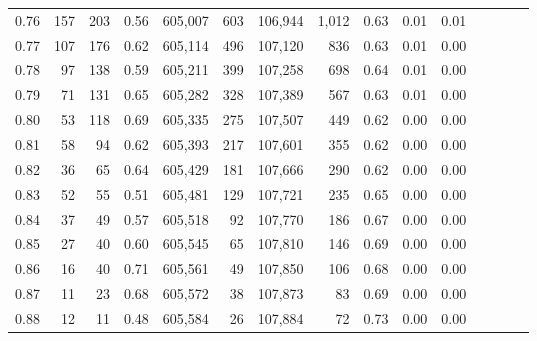 \begin{tabular}{rrrcrrrrrrrrrrr}
0.76 &     157 &    203 &                                       0.56 &  605,007 &      603 &  106,944 &    1,012 &  0.63 &  0.01 &                         0.01 \\
0.77 &     107 &    176 &                                       0.62 &  605,114 &      496 &  107,120 &      836 &  0.63 &  0.01 &                         0.00 \\
0.78 &      97 &    138 &                                       0.59 &  605,211 &      399 &  107,258 &      698 &  0.64 &  0.01 &                         0.00 \\
0.79 &      71 &    131 &                                       0.65 &  605,282 &      328 &  107,389 &      567 &  0.63 &  0.01 &                         0.00 \\
0.80 &      53 &    118 &                                       0.69 &  605,335 &      275 &  107,507 &      449 &  0.62 &  0.00 &                         0.00 \\
0.81 &      58 &     94 &                                       0.62 &  605,393 &      217 &  107,601 &      355 &  0.62 &  0.00 &                         0.00 \\
0.82 &      36 &     65 &                                       0.64 &  605,429 &      181 &  107,666 &      290 &  0.62 &  0.00 &                         0.00 \\
0.83 &      52 &     55 &                                       0.51 &  605,481 &      129 &  107,721 &      235 &  0.65 &  0.00 &                         0.00 \\
0.84 &      37 &     49 &                                       0.57 &  605,518 &       92 &  107,770 &      186 &  0.67 &  0.00 &                         0.00 \\
0.85 &      27 &     40 &                                       0.60 &  605,545 &       65 &  107,810 &      146 &  0.69 &  0.00 &                         0.00 \\
0.86 &      16 &     40 &                                       0.71 &  605,561 &       49 &  107,850 &      106 &  0.68 &  0.00 &                         0.00 \\
0.87 &      11 &     23 &                                       0.68 &  605,572 &       38 &  107,873 &       83 &  0.69 &  0.00 &                         0.00 \\
0.88 &      12 &     11 &                                       0.48 &  605,584 &       26 &  107,884 &       72 &  0.73 &  0.00 &                         0.00 \\

\end{tabular}
